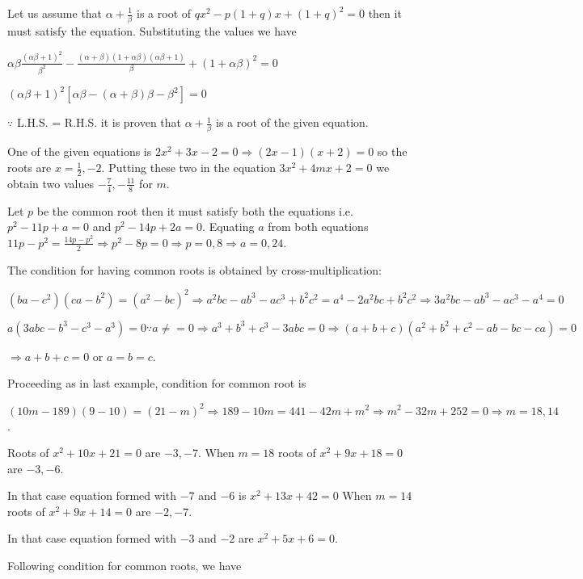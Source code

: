   Let us assume that $\alpha + \frac{1}{\beta}$ is a root of $qx^2 - p(1 + q)x + (1 + q)^2 = 0$ then
  it must satisfy the equation. Substituting the values we have

  $\alpha\beta\frac{(\alpha\beta + 1)^2}{\beta^2} - \frac{(\alpha + \beta)(1 + \alpha\beta)(\alpha\beta +
    1)}{\beta} + (1 + \alpha\beta)^2 = 0$

  $(\alpha\beta + 1)^2[\alpha\beta - (\alpha + \beta)\beta - \beta^2] = 0$

  $\because$ L.H.S. = R.H.S. it is proven that $\alpha + \frac{1}{\beta}$ is a root of the given
  equation.
\item One of the given equations is $2x^2 + 3x - 2 = 0 \Rightarrow (2x - 1)(x + 2) = 0$ so the roots are $x
  = \frac{1}{2}, -2$. Putting these two in the equation $3x^2 + 4mx + 2 = 0$ we obtain two values
  $-\frac{7}{4}, -\frac{11}{8}$ for $m$.
\item Let $p$ be the common root then it must satisfy both the equations i.e. $p^2 - 11p + a = 0$ and $p^2 -
  14p + 2a = 0$. Equating $a$ from both equations $11p - p^2 = \frac{14p - p^2}{2} \Rightarrow p^2 - 8p = 0
  \Rightarrow p = 0, 8\Rightarrow a = 0, 24$.
\item The condition for having common roots is obtained by cross-multiplication:

  $(ba - c^2)(ca - b^2) = (a^2 - bc)^2\Rightarrow a^2bc - ab^3 - ac^3 + b^2c^2 = a^4 - 2a^2bc +
  b^2c^2\Rightarrow 3a^2bc - ab^3 -ac^3 - a^4 = 0$

  $a(3abc - b^3 - c^3 - a^3) = 0\because a\ne = 0 \Rightarrow a^3 + b^3 + c^3 - 3abc = 0\Rightarrow (a + b +
  c)(a^2 + b^2 + c^2 - ab - bc - ca) = 0$

  $\Rightarrow a + b + c = 0$ or $a = b = c$.
\item Proceeding as in last example, condition for common root is

  $(10m - 189)(9 - 10) = (21 - m)^2\Rightarrow 189 - 10m = 441 - 42m + m^2 \Rightarrow m^2 - 32m + 252 = 0
  \Rightarrow m = 18, 14$.

  Roots of $x^2 + 10x + 21 = 0$ are $-3, -7$. When $m = 18$ roots of $x^2 + 9x + 18 = 0$ are $-3, -6$.

  In that case equation formed with $-7$ and $-6$ is $x^2 + 13x + 42 = 0$ When $m= 14$ roots of $x^2 + 9x
  + 14 = 0$ are $-2, -7$.

  In that case equation formed with $-3$ and $-2$ are $x^2 + 5x + 6 = 0$.
\item Following condition for common roots, we have


